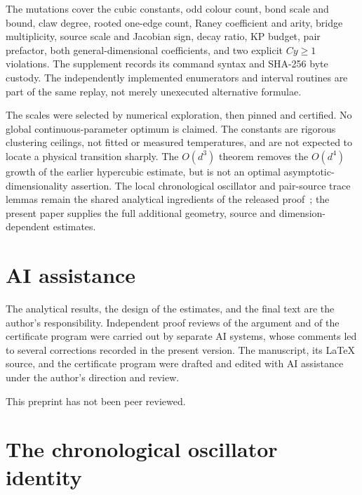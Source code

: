 \documentclass[11pt]{article}
\theoremstyle{plain}
\theoremstyle{remark}
\begin{document}
The mutations cover the cubic constants, odd colour count, bond scale and
bound, claw degree, rooted one-edge count, Raney coefficient and arity,
bridge multiplicity, source scale and Jacobian sign, decay ratio, KP budget,
pair prefactor, both general-dimensional coefficients, and two explicit
$Cy\ge1$ violations. The supplement records its command syntax and SHA-256
byte custody. The independently implemented enumerators and interval routines
are part of the same replay, not merely unexecuted alternative formulae.

The scales were selected by numerical exploration, then pinned and certified.
No global continuous-parameter optimum is claimed. The constants are rigorous
clustering ceilings, not fitted or measured temperatures, and are not expected
to locate a physical transition sharply. The $O(d^3)$ theorem removes the
$O(d^4)$ growth of the earlier hypercubic estimate, but is not an optimal
asymptotic-dimensionality assertion. The local chronological oscillator and
pair-source trace lemmas remain the shared analytical ingredients of the
released proof~\cite{rensSharp}; the present paper supplies the full
additional geometry, source and dimension-dependent estimates.

\section*{AI assistance}
The analytical results, the design of the estimates, and the final text are the
author's responsibility. Independent proof reviews of the argument and of the
certificate program were carried out by separate AI systems, whose comments led to
several corrections recorded in the present version. The manuscript, its LaTeX
source, and the certificate program were drafted and edited with AI assistance under
the author's direction and review.

This preprint has not been peer reviewed.

\appendix
\section{The chronological oscillator identity}\label{app:oscillator}
\end{document}
